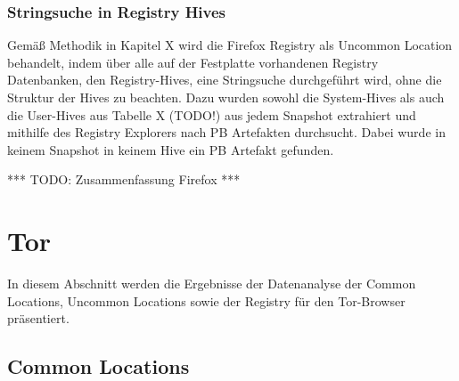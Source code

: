 \subsubsection*{Stringsuche in Registry Hives}

Gemäß Methodik in Kapitel X wird die Firefox Registry als Uncommon Location behandelt, indem über alle auf der Festplatte vorhandenen Registry Datenbanken, den Registry-Hives, eine Stringsuche durchgeführt wird, ohne die Struktur der Hives zu beachten. 
Dazu wurden sowohl die System-Hives als auch die User-Hives aus Tabelle X (TODO!) aus jedem Snapshot extrahiert und mithilfe des Registry Explorers nach PB Artefakten durchsucht.
Dabei wurde in keinem Snapshot in keinem Hive ein PB Artefakt gefunden.



*** TODO: Zusammenfassung Firefox ***


\newpage




\section{Tor}

In diesem Abschnitt werden die Ergebnisse der Datenanalyse der Common Locations, Uncommon Locations sowie der Registry für den Tor-Browser präsentiert.

\subsection*{Common Locations}

